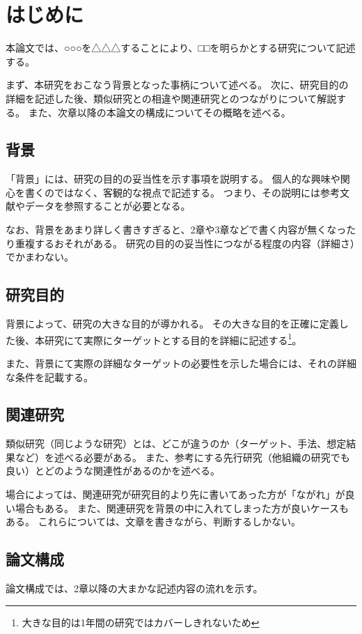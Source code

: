\documentclass[a4paper,11pt,oneside,openany]{jsbook}
\begin{document}
\chapter{はじめに}
本論文では、○○○を△△△することにより、□□を明らかとする研究について記述する。

まず、本研究をおこなう背景となった事柄について述べる。
次に、研究目的の詳細を記述した後、類似研究との相違や関連研究とのつながりについて解説する。
また、次章以降の本論文の構成についてその概略を述べる。

\section{背景}
「背景」には、研究の目的の妥当性を示す事項を説明する。
個人的な興味や関心を書くのではなく、客観的な視点で記述する。
つまり、その説明には参考文献やデータを参照することが必要となる。

なお、背景をあまり詳しく書きすぎると、2章や3章などで書く内容が無くなったり重複するおそれがある。
研究の目的の妥当性につながる程度の内容（詳細さ）でかまわない。

\section{研究目的}
背景によって、研究の大きな目的が導かれる。
その大きな目的を正確に定義した後、本研究にて実際にターゲットとする目的を詳細に記述する\footnote{大きな目的は1年間の研究ではカバーしきれないため}。

また、背景にて実際の詳細なターゲットの必要性を示した場合には、それの詳細な条件を記載する。

\section{関連研究}
類似研究（同じような研究）とは、どこが違うのか（ターゲット、手法、想定結果など）を述べる必要がある。
また、参考にする先行研究（他組織の研究でも良い）とどのような関連性があるのかを述べる。

場合によっては、関連研究が研究目的より先に書いてあった方が「ながれ」が良い場合もある。
また、関連研究を背景の中に入れてしまった方が良いケースもある。
これらについては、文章を書きながら、判断するしかない。

\section{論文構成}
論文構成では、2章以降の大まかな記述内容の流れを示す。
\end{document}
